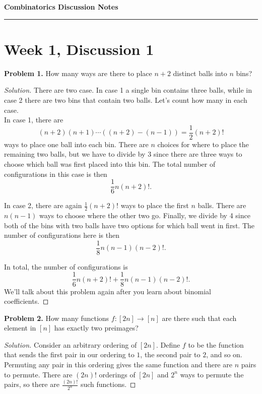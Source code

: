 \documentclass[11pt,letterpaper]{report}
\theoremstyle{definition}
\theoremstyle{remark}
\newenvironment{solution}
{\begin{proof}[Solution]}
{\end{proof}}
\begin{document}
\begin{center}
{\bf \Large Combinatorics Discussion Notes}
\vspace{0.2cm}
\hrule
\end{center}

\section{Week 1, Discussion 1}

\noindent\textbf{Problem 1. }How many ways are there to place $n+2$ distinct balls into $n$ bins?
\begin{solution}
    There are two case. In case 1 a single bin contains three balls, while in case 2 there are two bins that contain two balls. Let's count how many in each case.\\
    
    \noindent In case 1, there are
    $$
    (n+2)(n+1)\cdots ((n+2)-(n-1)) = \frac{1}{2}(n+2)!
    $$
    ways to place one ball into each bin. There are $n$ choices for where to place the remaining two balls, but we have to divide by 3 since there are three ways to choose which ball was first placed into this bin. The total number of configurations in this case is then
    $$\frac{1}{6}n(n+2)!.$$
    
    \noindent In case 2, there are again $\frac{1}{2}(n+2)!$ ways to place the first $n$ balls. There are $n(n-1)$ ways to choose where the other two go. Finally, we divide by 4 since both of the bins with two balls have two options for which ball went in first. The number of configurations here is then
    $$\frac{1}{8}n(n-1)(n-2)!.$$
    
    \noindent In total, the number of configurations is
    $$\frac{1}{6}n(n+2)! + \frac{1}{8}n(n-1)(n-2)!.$$
    We'll talk about this problem again after you learn about binomial coefficients.
\end{solution}

\noindent\textbf{Problem 2. }How many functions $f: [2n]\to [n]$ are there such that each element in $[n]$ has exactly two preimages?

\begin{solution}
    Consider an arbitrary ordering of $[2n]$. Define $f$ to be the function that sends the first pair in our ordering to $1$, the second pair to $2$, and so on. Permuting any pair in this ordering gives the same function and there are $n$ pairs to permute. There are $(2n)!$ orderings of $[2n]$ and $2^n$ ways to permute the pairs, so there are $\frac{(2n)!}{2^n}$ such functions.
\end{solution}
\end{document}
